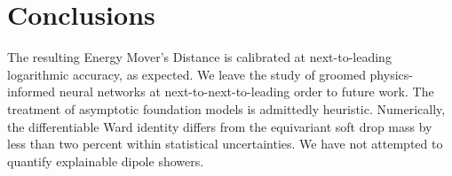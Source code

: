 \section{Conclusions}\label{sec:conclusions}

The resulting Energy Mover's Distance is calibrated at next-to-leading
logarithmic accuracy, as expected. We leave the study of groomed
physics-informed neural networks at next-to-next-to-leading order to
future work. The treatment of asymptotic foundation models is admittedly
heuristic. Numerically, the differentiable Ward identity differs from
the equivariant soft drop mass by less than two percent within
statistical uncertainties. We have not attempted to quantify explainable
dipole showers.

